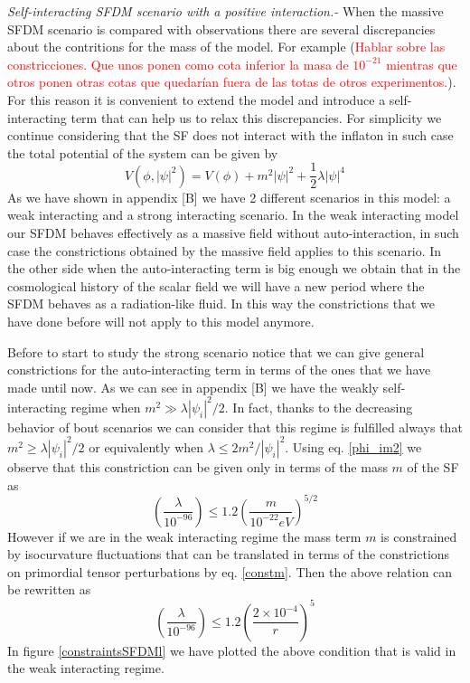 \documentclass[twocolumn,           %
               showpacs,            %
               preprintnumbers,     %
               aps,                 %
               prl,          	    %
               letterpaper,             %
               superscriptaddress,      %
               nofootinbib,         %
               tightenlines,        %
               floats,floatfix      %
               ,usenatbib,
               ]{revtex4-1}
\begin{document}
\textit{Self-interacting SFDM scenario with a positive interaction.-} When the massive SFDM scenario is compared with observations there are several discrepancies about the contritions for the mass of the model. For example (\textcolor{red}{Hablar sobre las constricciones. Que unos ponen como cota inferior la masa de $10^{-21}$ mientras que otros ponen otras cotas que quedarían fuera de las totas de otros experimentos.}). For this reason it is convenient to extend the model and introduce a self-interacting term that can help us to relax this discrepancies. For simplicity we continue considering that the SF does not interact with the inflaton in such case the total potential of the system can be given by
\begin{equation}
V(\phi,|\psi|^2)=V(\phi)+m^2|\psi|^2+\frac{1}{2}\lambda|\psi|^4
\end{equation}
As we have shown in appendix [B] we have 2 different scenarios in this model: a weak interacting and a strong interacting scenario. In the weak interacting model our SFDM behaves effectively as a massive field without auto-interaction, in such case the constrictions obtained by the massive field applies to this scenario. In the other side when the auto-interacting term is big enough we obtain that in the cosmological history of the scalar field we will have a new period where the SFDM behaves as a radiation-like fluid. In this way the constrictions that we have done before will not apply to this model anymore.

Before to start to study the strong scenario notice that we can give general constrictions for the auto-interacting term in terms of the ones that we have made until now. As we can see in appendix [B] we have the weakly self-interacting regime when $m^2\gg \lambda|\psi_i|^2/2$. In fact, thanks to the decreasing behavior of bout scenarios we can consider that this regime is fulfilled always that $m^2\geq \lambda|\psi_i|^2/2$ or equivalently when $\lambda\leq 2m^2/|\psi_i|^2$. Using eq. \eqref{phi_im2} we observe that this constriction can be given only in terms of the mass $m$ of the SF as
\begin{equation}
\left(\frac{\lambda}{10^{-96}}\right)\leq 1.2\left(\frac{m}{10^{-22}eV}\right)^{5/2}
\end{equation}
However if we are in the weak interacting regime the mass term $m$ is constrained by isocurvature fluctuations that can be translated in terms of the constrictions on primordial tensor perturbations by eq. \eqref{constm}. Then the above relation can be rewritten as
\begin{equation}
\left(\frac{\lambda}{10^{-96}}\right)\leq 1.2\left(\frac{2\times 10^{-4}}{r}\right)^5
\end{equation}
In figure \ref{constraintsSFDMl} we have plotted the above condition that is valid in the weak interacting regime.
\end{document}
